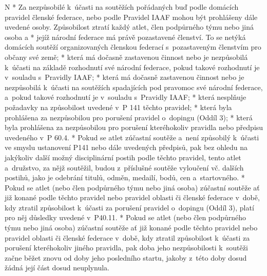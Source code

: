 \begitems \style N
* Za nezpůsobilé k~účasti na soutěžích pořádaných buď podle domácích pravidel členské federace, nebo podle Pravidel IAAF mohou být prohlášeny dále uvedené osoby.
Způsobilost ztratí každý atlet, člen podpůrného týmu nebo jiná osoba
  \begitems \style a
  * jejíž národní federace má právě pozastavené členství. To se netýká domácích soutěží organizovaných členskou federací s~pozastaveným členstvím pro občany své země;
  * která má dočasně zastavenou činnost nebo je nezpůsobilá k~účasti na základě rozhodnutí své národní federace, pokud takové rozhodnutí je v~souladu s~Pravidly IAAF;
  * která má dočasně zastavenou činnost nebo je nezpůsobilá k~účasti na soutěžích spadajících pod pravomoc své národní federace, a~pokud takové rozhodnutí je v~souladu s~Pravidly IAAF;
  * která nesplňuje požadavky na způsobilost uvedené v~P 141 těchto pravidel;
  * která byla prohlášena za nezpůsobilou pro porušení pravidel o~dopingu (Oddíl 3);
  * která byla prohlášena za nezpůsobilou pro porušení kteréhokoliv pravidla nebo předpisu uvedeného v~P 60.4.
  \enditems
* Pokud se atlet zúčastní soutěže a~není způsobilý k~účasti ve smyslu ustanovení P141 nebo dále uvedených předpisů, pak bez ohledu na jakýkoliv další možný disciplinární postih podle těchto pravidel, tento atlet a~družstvo, za nějž soutěžil, budou z~příslušné soutěže vyloučení vč. dalších postihů, jako je odebrání titulů, odměn, medailí, bodů, cen a~startovného.
* Pokud se atlet (nebo člen podpůrného týmu nebo jiná osoba) zúčastní soutěže ať již konané podle těchto pravidel nebo pravidel oblasti či členské federace v~době, kdy ztratil způsobilost k~účasti za porušení pravidel o~dopingu (Oddíl 3), platí pro něj důsledky uvedené v~P40.11.
* Pokud se atlet (nebo člen podpůrného týmu nebo jiná osoba) zúčastní soutěže ať již konané podle těchto pravidel nebo pravidel oblasti či členské federace v~době, kdy ztratil způsobilost k~účasti za porušení kteréhokoliv jiného pravidla, pak doba jeho nezpůsobilosti k~soutěži začne běžet znovu od doby jeho posledního startu, jakoby z~této doby dosud žádná její část dosud neuplynula.
\enditems

\endinput